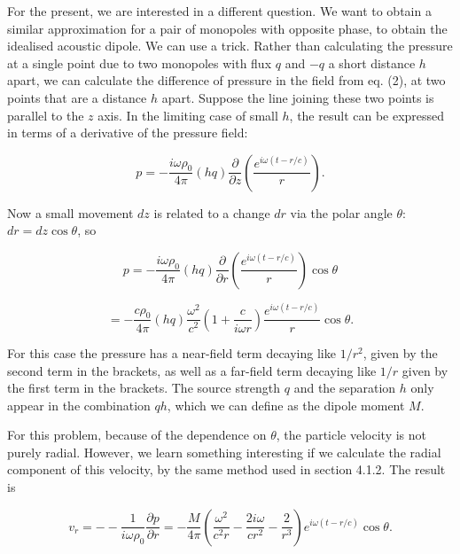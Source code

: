   For the present, we are interested in a different question. We want to obtain 
  a similar approximation for a pair of monopoles with opposite phase, to 
  obtain the idealised acoustic dipole. We can use a trick. Rather than 
  calculating the pressure at a single point due to two monopoles with flux $q$ 
  and $-q$ a short distance $h$ apart, we can calculate the difference of 
  pressure in the field from eq. (2), at two points that are a distance $h$ 
  apart. Suppose the line joining these two points is parallel to the $z$ axis. 
  In the limiting case of small $h$, the result can be expressed in terms of a 
  derivative of the pressure field: 

  \begin{equation*}p=-\dfrac{i \omega \rho_0 }{4 \pi} (hq) 
  \dfrac{\partial}{\partial z} \left( \dfrac{e^{i \omega(t-r/c)}}{r} \right) . 
  \tag{4}\end{equation*} 

  Now a small movement $dz$ is related to a change $dr$ via the polar angle 
  $\theta$: $dr=dz \cos \theta$, so 

  \begin{equation*}p=-\dfrac{i \omega \rho_0}{4 \pi} (hq) 
  \dfrac{\partial}{\partial r} \left( \dfrac{e^{i \omega(t-r/c)}}{r} \right) 
  \cos \theta \tag{5}\end{equation*} 

  \begin{equation*}=-\dfrac{c \rho_0 }{4 \pi} (hq) \dfrac{\omega^2}{c^2} \left( 
  1+ \dfrac{c}{i \omega r}\right) \dfrac{e^{i \omega(t-r/c)}}{r} \cos \theta 
  .\tag{6}\end{equation*} 

  For this case the pressure has a near-field term decaying like $1/r^2$, given 
  by the second term in the brackets, as well as a far-field term decaying like 
  $1/r$ given by the first term in the brackets. The source strength $q$ and 
  the separation $h$ only appear in the combination $qh$, which we can define 
  as the dipole moment $M$. 

  For this problem, because of the dependence on $\theta$, the particle 
  velocity is not purely radial. However, we learn something interesting if we 
  calculate the radial component of this velocity, by the same method used in 
  section 4.1.2. The result is 

  \begin{equation*}v_r = -- \dfrac{1}{i \omega \rho_0} \dfrac{\partial 
  p}{\partial r} = -\dfrac{M}{4 \pi} \left(\dfrac{\omega^2}{c^2 r} -\dfrac{2 i 
  \omega}{c r^2} -\dfrac{2}{r^3} \right) e^{i \omega(t-r/c)} \cos \theta . 
  \tag{7}\end{equation*} 


